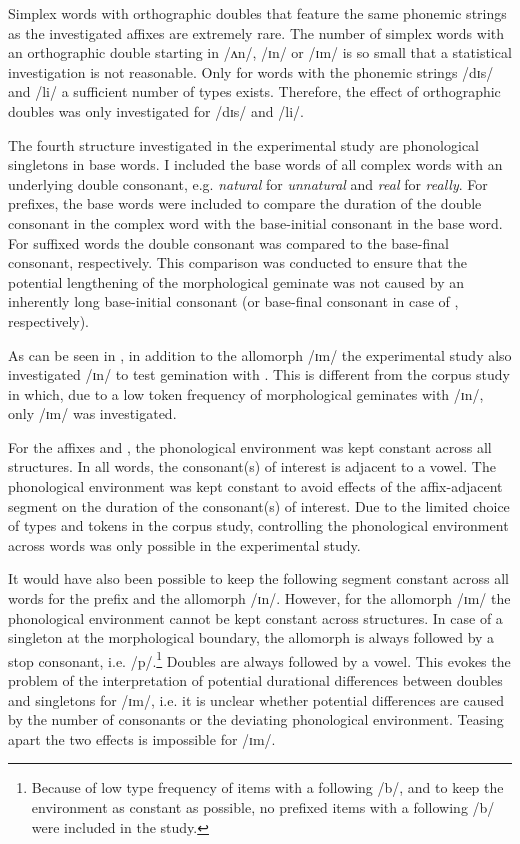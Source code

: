 \clearpage

Simplex words with orthographic doubles that feature the same phonemic strings as the investigated affixes are extremely rare. The number of simplex words with an orthographic double starting in /ʌn/, /ɪn/ or /ɪm/ is so small that a statistical investigation is not reasonable. Only for words with the phonemic strings /dɪs/ and /li/ a sufficient number of types exists. Therefore, the effect of orthographic doubles was only investigated for /dɪs/ and /li/. 


The fourth structure investigated in the experimental study are phonological singletons in base words. I included the base words of all complex words with an underlying double consonant, e.g. \textit{natural} for \textit{unnatural} and \textit{real} for \textit{really}. For prefixes, the base words were included to compare the duration of the double consonant in the complex word with the base-initial consonant in the base word. For suffixed words the double consonant was compared to the base-final consonant, respectively. This comparison was conducted to ensure that the potential lengthening of the morphological geminate was not caused by an inherently long base-initial consonant (or base-final consonant in case of , respectively).


As can be seen in , in addition to  the allomorph /ɪm/  the experimental study also investigated /ɪn/ to test gemination with . This is different from the corpus study in which, due to a low token frequency of morphological geminates with /ɪn/, only /ɪm/ was investigated.  

For the affixes  and , the phonological environment was kept constant across all structures. In all words, the consonant(s) of interest is adjacent to a vowel. 
The phonological environment was kept constant to avoid effects of the affix-adjacent segment on the duration of the consonant(s) of interest. Due to the limited choice of types and tokens in the corpus study, controlling the phonological environment across words was only possible in the experimental study.%

It would have also been possible to keep the following segment constant across all words for the prefix  and the allomorph /ɪn/. However, for the allomorph /ɪm/ the phonological environment cannot be kept constant across structures. In case of a singleton at the morphological boundary, the allomorph is always followed  by a stop consonant, i.e. /p/.\footnote{Because of low type frequency of items with a following /b/, and to keep the environment as constant as possible, no prefixed items with a following /b/ were included in the study.} Doubles are always followed by a vowel. This evokes the problem of the interpretation of potential durational differences between doubles and singletons for /ɪm/, i.e. it is unclear whether potential differences are caused by the number of consonants or the deviating phonological environment. Teasing apart the two effects is impossible for /ɪm/.

